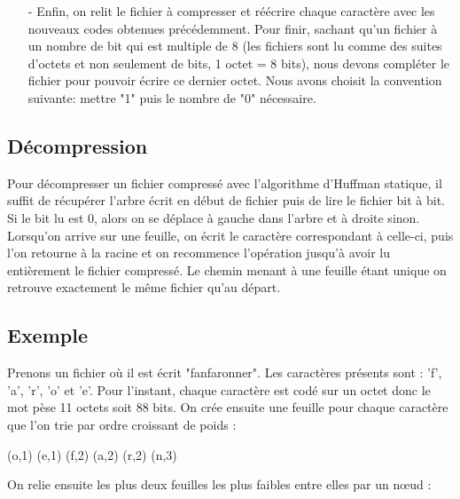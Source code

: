 \documentclass{report}
\begin{document}
\begin{itemize}
\item[-] Enfin, on relit le fichier à compresser et réécrire chaque caractère avec les nouveaux codes obtenues précédemment. Pour finir, sachant qu'un fichier à un nombre de bit qui est multiple de 8 (les fichiers sont lu comme des suites d'octets et non seulement de bits, 1 octet = 8 bits), nous devons compléter le fichier pour pouvoir écrire ce dernier octet.
Nous avons choisit la convention suivante: mettre "1" puis le nombre de "0" nécessaire. \\

\end{itemize}
\subsection*{Décompression}
Pour décompresser un fichier compressé avec l'algorithme d'Huffman statique, il suffit de récupérer l'arbre écrit en début de fichier puis de lire le fichier bit à bit. Si le bit lu est  0, alors on se déplace à gauche dans l'arbre et à droite sinon. Lorsqu'on arrive sur une feuille, on écrit le caractère correspondant à celle-ci, puis l'on retourne à la racine et on recommence l'opération jusqu'à avoir lu entièrement le fichier compressé. Le chemin menant à une feuille étant unique on retrouve exactement le même fichier qu'au départ.
\subsection*{Exemple}
Prenons un fichier où il est écrit "fanfaronner". Les caractères présents sont : 'f', 'a', 'r', 'o' et 'e'. Pour l'instant, chaque caractère est codé sur un octet donc le mot pèse 11 octets soit 88 bits.
On crée ensuite une feuille pour chaque caractère que l'on trie par ordre croissant de poids :
\begin{center}
(o,1) (e,1) (f,2) (a,2) (r,2) (n,3)
\end{center}
\begin{flushleft}
\end{flushleft}
On relie ensuite les plus deux feuilles les plus faibles entre elles par un nœud :

\begin{center}
\end{center}
\end{document}
